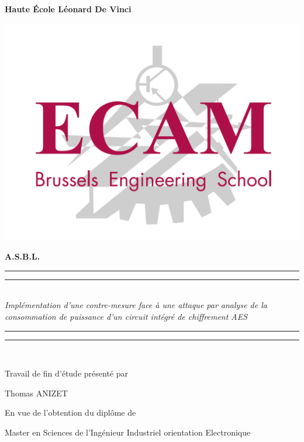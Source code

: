 \documentclass[oneside]{book}
\begin{document}
\thispagestyle{empty}

\vspace{2cm}
\begin{center}
	\centerline{\textbf{Haute École Léonard De Vinci}}
	\includegraphics[scale=0.15]{logos/logo-ecam.png}\\
	\centerline{\textbf{A.S.B.L.}}
	\vspace{3cm}

	\rule[0.5ex]{\linewidth}{2pt}\vspace*{-\baselineskip}\vspace*{3.2pt}
	\rule[0.5ex]{\linewidth}{1pt}\\[\baselineskip]
	{\Large \textit{Implémentation d'une contre-mesure face à une attaque par analyse de la consommation de puissance d'un circuit intégré de chiffrement AES}}\\
	\vspace{4mm}
	\rule[0.5ex]{\linewidth}{1pt}\vspace*{-\baselineskip}\vspace*{4pt}
	\rule[0.5ex]{\linewidth}{2pt}\\[\baselineskip]

\end{center}

\vspace{5cm}
      \begin{flushright} \large
        Travail de fin d'étude présenté par 

        Thomas ANIZET
        
        En vue de l'obtention du diplôme de
        
        Master en Sciences de l’Ingénieur Industriel orientation Electronique
      \end{flushright}
\vspace{9mm}
\end{document}
